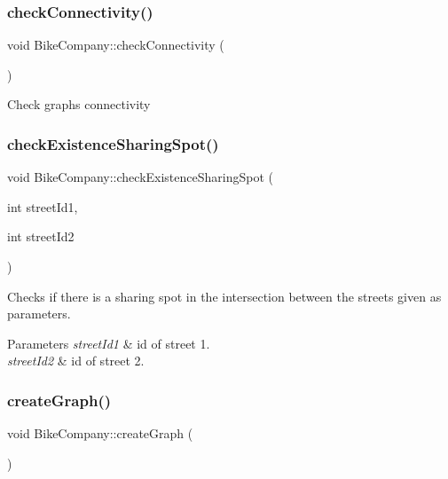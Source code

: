 \subsubsection{\texorpdfstring{check\+Connectivity()}{checkConnectivity()}}
{\footnotesize\ttfamily void Bike\+Company\+::check\+Connectivity (\begin{DoxyParamCaption}{ }\end{DoxyParamCaption})}

Check graph\textquotesingle{}s connectivity \mbox{\label{class_bike_company_a626158626f8a845c8002731d74231a42}} 
\subsubsection{\texorpdfstring{check\+Existence\+Sharing\+Spot()}{checkExistenceSharingSpot()}}
{\footnotesize\ttfamily void Bike\+Company\+::check\+Existence\+Sharing\+Spot (\begin{DoxyParamCaption}\item[{int}]{street\+Id1,  }\item[{int}]{street\+Id2 }\end{DoxyParamCaption})}

Checks if there is a sharing spot in the intersection between the streets given as parameters. 
\begin{DoxyParams}{Parameters}
{\em street\+Id1} & id of street 1. \\
\hline
{\em street\+Id2} & id of street 2. \\
\hline
\end{DoxyParams}
\mbox{\label{class_bike_company_ace655ae1ace35afcb0acb4ae842215df}} 
\subsubsection{\texorpdfstring{create\+Graph()}{createGraph()}}
{\footnotesize\ttfamily void Bike\+Company\+::create\+Graph (\begin{DoxyParamCaption}{ }\end{DoxyParamCaption})}

